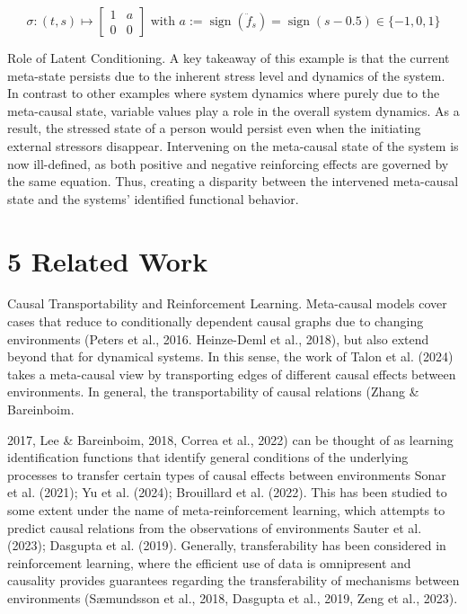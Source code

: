 \documentclass[10pt]{article}
\begin{document}
$$
\sigma:(t, s) \mapsto\left[\begin{array}{ll}
1 & a \\
0 & 0
\end{array}\right] \text { with } a:=\operatorname{sign}\left(\ddot{f}_{s}\right)=\operatorname{sign}(s-0.5) \in\{-1,0,1\}
$$

Role of Latent Conditioning. A key takeaway of this example is that the current meta-state persists due to the inherent stress level and dynamics of the system. In contrast to other examples where system dynamics where purely due to the meta-causal state, variable values play a role in the overall system dynamics. As a result, the stressed state of a person would persist even when the initiating external stressors disappear. Intervening on the meta-causal state of the system is now ill-defined, as both positive and negative reinforcing effects are governed by the same equation. Thus, creating a disparity between the intervened meta-causal state and the systems' identified functional behavior.

\section*{5 Related Work}
Causal Transportability and Reinforcement Learning. Meta-causal models cover cases that reduce to conditionally dependent causal graphs due to changing environments (Peters et al., 2016. Heinze-Deml et al., 2018), but also extend beyond that for dynamical systems. In this sense, the work of Talon et al. (2024) takes a meta-causal view by transporting edges of different causal effects between environments. In general, the transportability of causal relations (Zhang \& Bareinboim.

2017, Lee \& Bareinboim, 2018, Correa et al., 2022) can be thought of as learning identification functions that identify general conditions of the underlying processes to transfer certain types of causal effects between environments Sonar et al. (2021); Yu et al. (2024); Brouillard et al. (2022). This has been studied to some extent under the name of meta-reinforcement learning, which attempts to predict causal relations from the observations of environments Sauter et al. (2023); Dasgupta et al. (2019). Generally, transferability has been considered in reinforcement learning, where the efficient use of data is omnipresent and causality provides guarantees regarding the transferability of mechanisms between environments (Sæmundsson et al., 2018, Dasgupta et al., 2019, Zeng et al., 2023).
\end{document}

